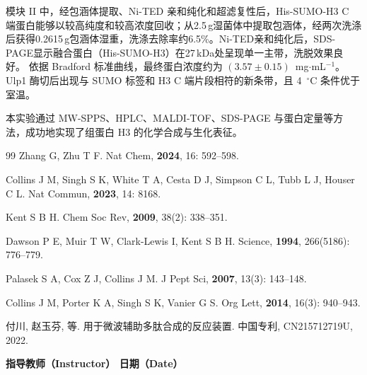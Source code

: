 \documentclass[a4paper]{article}
\newcommand{\zihaoWu}{\fontsize{10.5pt}{16pt}\selectfont}
\begin{document}
模块 II 中，经包涵体提取、Ni-TED 亲和纯化和超滤复性后，His-SUMO-H3 C 端蛋白能够以较高纯度和较高浓度回收；从2.5 g湿菌体中提取包涵体，经两次洗涤后获得0.2615 g包涵体湿重，洗涤去除率约6.5\%。Ni-TED亲和纯化后，SDS-PAGE显示融合蛋白（His-SUMO-H3）在27 kDa处呈现单一主带，洗脱效果良好。
依据 Bradford 标准曲线，最终蛋白浓度约为 $(3.57\pm0.15)$~mg$\cdot$mL$^{-1}$。Ulp1 酶切后出现与 SUMO 标签和 H3 C 端片段相符的新条带，且 4~$^{\circ}$C 条件优于室温。

本实验通过 MW-SPPS、HPLC、MALDI-TOF、SDS-PAGE 与蛋白定量等方法，成功地实现了组蛋白 H3 的化学合成与生化表征。


\vspace{3em}
{\footnotesize
	\begin{thebibliography}{99}
		Zhang G, Zhu T F. Nat Chem, \textbf{2024}, 16: 592--598.

		Collins J M, Singh S K, White T A, Cesta D J, Simpson C L, Tubb L J, Houser C L. Nat Commun, \textbf{2023}, 14: 8168.

		Kent S B H. Chem Soc Rev, \textbf{2009}, 38(2): 338--351.

		Dawson P E, Muir T W, Clark-Lewis I, Kent S B H. Science, \textbf{1994}, 266(5186): 776--779.

		Palasek S A, Cox Z J, Collins J M. J Pept Sci, \textbf{2007}, 13(3): 143--148.

		Collins J M, Porter K A, Singh S K, Vanier G S. Org Lett, \textbf{2014}, 16(3): 940--943.

		付川, 赵玉芬, 等. 用于微波辅助多肽合成的反应装置. 中国专利, CN215712719U, 2022.
	\end{thebibliography}
}


\vspace*{\fill}
\noindent{\zihaoWu 评语（Remarks）：}

\vspace{2em}

\begin{center}
	{\zihaoWu\bfseries 指导教师（Instructor）\hspace{8em} 日期（Date）}
\end{center}

\vspace{1.5cm}
\end{document}
